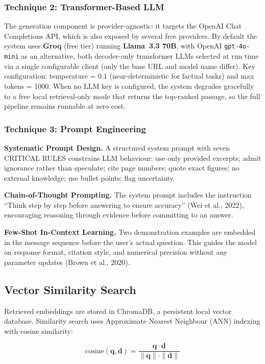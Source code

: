 \documentclass[12pt,a4paper]{article}
\begin{document}
\subsubsection{Technique 2: Transformer-Based LLM}

The generation component is provider-agnostic: it targets the OpenAI Chat Completions API, which is also exposed by several free providers. By default the system uses \textbf{Groq} (free tier) running \textbf{Llama~3.3 70B}, with OpenAI \texttt{gpt-4o-mini} as an alternative, both decoder-only transformer LLMs selected at run time via a single configurable client (only the base URL and model name differ). Key configuration: temperature = 0.1 (near-deterministic for factual tasks) and max tokens = 1000. When no LLM key is configured, the system degrades gracefully to a free local retrieval-only mode that returns the top-ranked passage, so the full pipeline remains runnable at zero cost.

\subsubsection{Technique 3: Prompt Engineering}

\textbf{Systematic Prompt Design.}
A structured system prompt with seven CRITICAL RULES constrains LLM behaviour: use only provided excerpts; admit ignorance rather than speculate; cite page numbers; quote exact figures; no external knowledge; use bullet points; flag uncertainty.

\textbf{Chain-of-Thought Prompting.}
The system prompt includes the instruction ``Think step by step before answering to ensure accuracy'' (Wei et al., 2022), encouraging reasoning through evidence before committing to an answer.

\textbf{Few-Shot In-Context Learning.}
Two demonstration examples are embedded in the message sequence before the user's actual question. This guides the model on response format, citation style, and numerical precision without any parameter updates (Brown et al., 2020).

\subsection{Vector Similarity Search}

Retrieved embeddings are stored in ChromaDB, a persistent local vector database. Similarity search uses Approximate Nearest Neighbour (ANN) indexing with cosine similarity:

\begin{equation}
  \text{cosine}(\mathbf{q}, \mathbf{d})
    = \frac{\mathbf{q} \cdot \mathbf{d}}{\|\mathbf{q}\| \cdot \|\mathbf{d}\|}
\end{equation}
\end{document}
